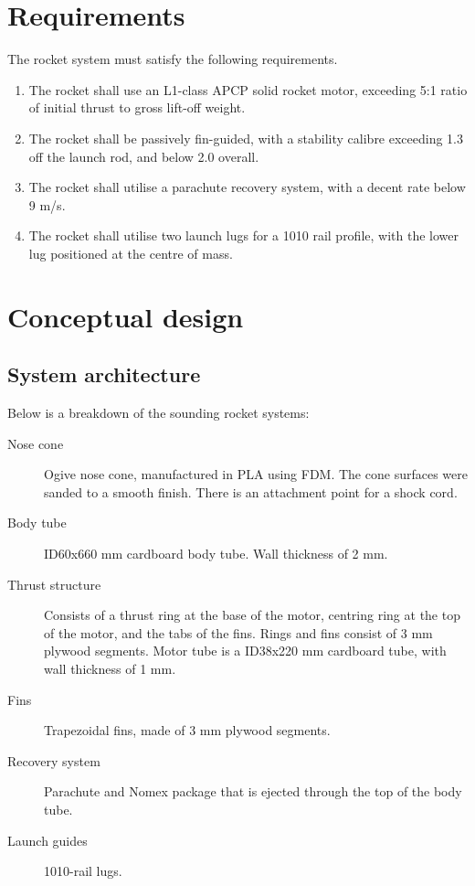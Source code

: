 \documentclass{article}
\begin{document}
\section{Requirements}

The rocket system must satisfy the following requirements.

\begin{enumerate}
    \item The rocket shall use an L1-class APCP solid rocket motor, exceeding 5:1 ratio of initial thrust to gross lift-off weight.
    \item The rocket shall be passively fin-guided, with a stability calibre exceeding 1.3 off the launch rod, and below 2.0 overall.
    \item The rocket shall utilise a parachute recovery system, with a decent rate below 9 m/s.
    \item The rocket shall utilise two launch lugs for a 1010 rail profile, with the lower lug positioned at the centre of mass.
\end{enumerate}

\section{Conceptual design}

\subsection{System architecture}

Below is a breakdown of the sounding rocket systems:

\begin{description}
    \item [Nose cone] Ogive nose cone, manufactured in PLA using FDM. The cone surfaces were sanded to a smooth finish. There is an attachment point for a shock cord.
    \item [Body tube] ID60x660 mm cardboard body tube. Wall thickness of 2 mm.
    \item [Thrust structure] Consists of a thrust ring at the base of the motor, centring ring at the top of the motor, and the tabs of the fins. Rings and fins consist of 3 mm plywood segments. Motor tube is a ID38x220 mm cardboard tube, with wall thickness of 1 mm. 
    \item [Fins] Trapezoidal fins, made of 3 mm plywood segments.
    \item [Recovery system] Parachute and Nomex package that is ejected through the top of the body tube.
    \item [Launch guides] 1010-rail lugs.
\end{description}
\end{document}
